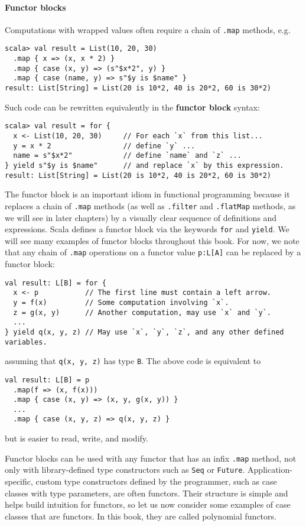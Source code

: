 \paragraph{Functor blocks}

Computations with wrapped values often require a chain of \lstinline!.map!
methods, e.g.
\begin{lstlisting}
scala> val result = List(10, 20, 30)
  .map { x => (x, x * 2) }
  .map { case (x, y) => (s"$x*2", y) }
  .map { case (name, y) => s"$y is $name" }
result: List[String] = List(20 is 10*2, 40 is 20*2, 60 is 30*2)
\end{lstlisting}
Such code can be rewritten equivalently in the \textbf{functor
block} syntax:
\begin{lstlisting}
scala> val result = for {
  x <- List(10, 20, 30)     // For each `x` from this list...
  y = x * 2                 // define `y` ...
  name = s"$x*2"            // define `name` and `z` ...
} yield s"$y is $name"      // and replace `x` by this expression. 
result: List[String] = List(20 is 10*2, 40 is 20*2, 60 is 30*2)
\end{lstlisting}
The functor block is an important idiom in functional programming
because it replaces a chain of \lstinline!.map! methods (as well
as \lstinline!.filter! and \lstinline!.flatMap! methods, as we will
see in later chapters) by a visually clear sequence of definitions
and expressions. Scala defines a functor block via the keywords \lstinline!for!
and \lstinline!yield!. We will see many examples of functor blocks
throughout this book. For now, we note that any chain of \lstinline!.map!
operations on a functor value \lstinline!p:L[A]! can be replaced
by a functor block:
\begin{lstlisting}
val result: L[B] = for {
  x <- p           // The first line must contain a left arrow.
  y = f(x)         // Some computation involving `x`.
  z = g(x, y)      // Another computation, may use `x` and `y`.
  ...
} yield q(x, y, z) // May use `x`, `y`, `z`, and any other defined variables.
\end{lstlisting}
assuming that \lstinline!q(x, y, z)! has type \lstinline!B!. The
above code is equivalent to
\begin{lstlisting}
val result: L[B] = p
  .map(f => (x, f(x)))
  .map { case (x, y) => (x, y, g(x, y)) }
  ...
  .map { case (x, y, z) => q(x, y, z) }
\end{lstlisting}
but is easier to read, write, and modify.

Functor blocks can be used with any functor that has an infix \lstinline!.map!
method, not only with library-defined type constructors such as \lstinline!Seq!
or \lstinline!Future!. Application-specific, custom type constructors
defined by the programmer, such as case classes with type parameters,
are often functors. Their structure is simple and helps build intuition
for functors, so let us now consider some examples of case classes
that are functors. In this book, they are called polynomial functors.

